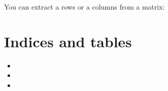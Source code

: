 \documentclass[letterpaper,10pt,english]{sphinxmanual}
\begin{document}
\sphinxAtStartPar
You can extract a rows or a columns from a matrix:

\begin{sphinxVerbatim}[commandchars=\\\{\}]
\end{sphinxVerbatim}


\chapter{Indices and tables}
\label{\detokenize{index:indices-and-tables}}\begin{itemize}
\item {} 
\sphinxAtStartPar
{}

\item {} 
\sphinxAtStartPar
{}

\item {} 
\sphinxAtStartPar
{}

\end{itemize}



\renewcommand{\indexname}{Index}
\printindex
\end{document}
